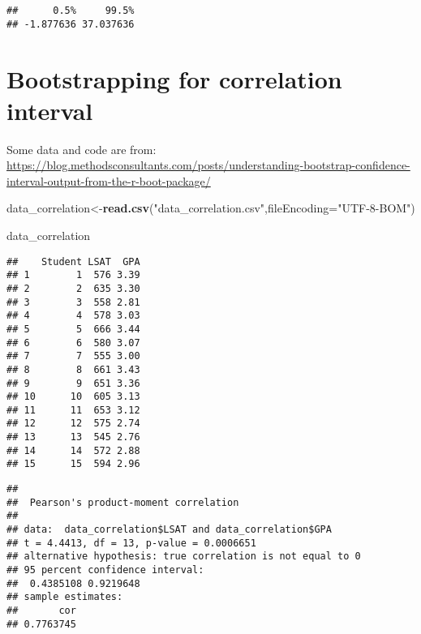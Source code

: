 \documentclass[]{book}
\newenvironment{Shaded}{\begin{snugshade}}{\end{snugshade}}
\newcommand{\DataTypeTok}[1]{\textcolor[rgb]{0.13,0.29,0.53}{#1}}
\newcommand{\KeywordTok}[1]{\textcolor[rgb]{0.13,0.29,0.53}{\textbf{#1}}}
\newcommand{\NormalTok}[1]{#1}
\newcommand{\OperatorTok}[1]{\textcolor[rgb]{0.81,0.36,0.00}{\textbf{#1}}}
\newcommand{\StringTok}[1]{\textcolor[rgb]{0.31,0.60,0.02}{#1}}
\begin{document}
\begin{verbatim}
##      0.5%     99.5% 
## -1.877636 37.037636
\end{verbatim}

\hypertarget{bootstrapping-for-correlation-interval}{%
\section{Bootstrapping for correlation interval}\label{bootstrapping-for-correlation-interval}}

Some data and code are from: \url{https://blog.methodsconsultants.com/posts/understanding-bootstrap-confidence-interval-output-from-the-r-boot-package/}

\begin{Shaded}
\begin{Highlighting}[]
\NormalTok{data_correlation<-}\KeywordTok{read.csv}\NormalTok{(}\StringTok{"data_correlation.csv"}\NormalTok{,}\DataTypeTok{fileEncoding=}\StringTok{"UTF-8-BOM"}\NormalTok{)}

\NormalTok{data_correlation}
\end{Highlighting}
\end{Shaded}

\begin{verbatim}
##    Student LSAT  GPA
## 1        1  576 3.39
## 2        2  635 3.30
## 3        3  558 2.81
## 4        4  578 3.03
## 5        5  666 3.44
## 6        6  580 3.07
## 7        7  555 3.00
## 8        8  661 3.43
## 9        9  651 3.36
## 10      10  605 3.13
## 11      11  653 3.12
## 12      12  575 2.74
## 13      13  545 2.76
## 14      14  572 2.88
## 15      15  594 2.96
\end{verbatim}

\begin{Shaded}
\end{Shaded}

\begin{verbatim}
## 
##  Pearson's product-moment correlation
## 
## data:  data_correlation$LSAT and data_correlation$GPA
## t = 4.4413, df = 13, p-value = 0.0006651
## alternative hypothesis: true correlation is not equal to 0
## 95 percent confidence interval:
##  0.4385108 0.9219648
## sample estimates:
##       cor 
## 0.7763745
\end{verbatim}
\end{document}

